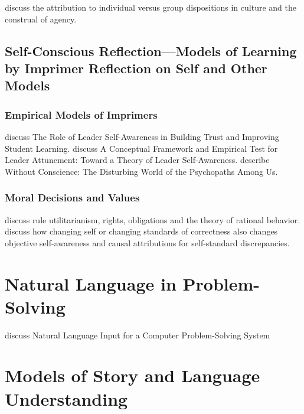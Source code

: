 \cite{menon2005cacoa} discuss the attribution to individual versus group dispositions in culture and the construal of agency.

\subsection{Self-Conscious Reflection---Models of Learning by Imprimer Reflection on Self and Other Models}

\subsubsection{Empirical Models of Imprimers}

\cite{hinton2008rlsa} discuss The Role of Leader Self-Awareness in Building Trust and Improving Student Learning.
\cite{taylor2007cfetla} discuss A Conceptual Framework and Empirical Test for Leader Attunement: Toward a Theory of Leader Self-Awareness.
\cite{hare1993wc} describe Without Conscience: The Disturbing World of the Psychopaths Among Us.

\subsubsection{Moral Decisions and Values}

\cite{harsanyi1980rur} discuss rule utilitarianism, rights, obligations and the theory of rational behavior.
\cite{duval1999osa} discuss how changing self or changing standards of correctness also changes objective self-awareness and causal attributions for self-standard discrepancies.


\section{Natural Language in Problem-Solving}

\cite{bobrow1968nlicpss} discuss Natural Language Input for a Computer Problem-Solving System



\section{Models of Story and Language Understanding}


